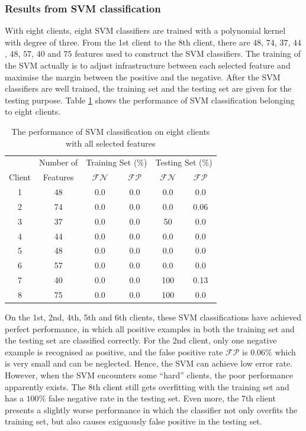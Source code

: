 \subsubsection{Results from SVM classification}
With eight clients, eight SVM classifiers are trained with a polynomial kernel with degree of three. From the 1st client to the 8th client, there are $48$, $74$, $37$, $44$, $48$, $57$, $40$ and $75$ features used to construct the SVM classifiers. %
The training of the SVM actually is to adjust infrastructure between each selected feature and maximise the margin between the positive and the negative. After the SVM classifiers are well trained, the training set and the testing set are given for the testing purpose. \mbox{Table} \ref{tab:svmevaluation} shows the performance of SVM classification belonging to eight clients.
\begin{table}[ht]
\caption{The performance of SVM classification on eight clients with all selected features}
 \begin{center}
   \begin{tabular}{|c|c|c|c|c|c|}
  \hline
    & Number of &\multicolumn{2}{c|}{Training Set (\%)} & \multicolumn{2}{c|}{Testing Set (\%)}\\
   \cline{3-6}
  Client & Features &$\mathcal{FN}$ & $\mathcal{FP}$ & $\mathcal{FN}$ & $\mathcal{FP}$ \\
  \hline
  1 & 48 & 0.0 & 0.0 & 0.0 & 0.0\\
  2 & 74 & 0.0 & 0.0 & 0.0 & 0.06\\
  3 & 37 & 0.0 & 0.0 & 50 & 0.0\\
  4 & 44 & 0.0 & 0.0 & 0.0 & 0.0\\
  5 & 48 & 0.0 & 0.0 & 0.0 & 0.0\\
  6 & 57 & 0.0 & 0.0 & 0.0 & 0.0\\
  7 & 40 & 0.0 & 0.0 & 100 & 0.13\\
  8 & 75 & 0.0 & 0.0 & 100 & 0.0\\
  \hline
 \end{tabular}
 \end{center}
\label{tab:svmevaluation}
\end{table} 
On the 1st, 2nd, 4th, 5th and 6th clients, these SVM classifications have achieved perfect performance, in which all positive examples in both the training set and the testing set are classified correctly. For the 2nd client, only one negative example is recognised as positive, and the false positive rate $\mathcal{FP}$ is $0.06\%$ which is very small and can be neglected. Hence, the SVM can achieve low error rate. However, when the SVM encounters some ``hard'' clients, the poor performance apparently exists. The 8th client still gets overfitting with the training set and has a $100\%$ false negative rate in the testing set. Even more, the 7th client presents a slightly worse performance in which the classifier not only overfits the training set, but also causes exiguously false positive in the testing set. %

